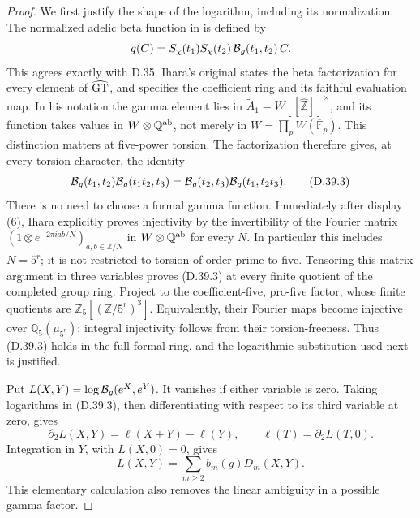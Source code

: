 \begin{proof}
We first justify the shape of the logarithm, including its
normalization. The normalized adelic beta function in
\cite[\S2.3, p.~101]{PBC_Furusho2003} is defined by
\[
 g(C)=S_\chi(t_1)S_\chi(t_2)\,{\cal B}_g(t_1,t_2)\,C.
\]
This agrees exactly with D.35. Ihara's original
\cite[introduction, p.~1, and \S2, display (6), preprint p.~9]{DE_Ihara2000}
states the beta factorization for every element of
\(\widehat{\rm GT}\), and specifies the coefficient
ring and its faithful evaluation map. In his notation
the gamma element lies in
\(\widetilde A_1=W[[\widehat{\mathbb Z}]]^\times\), and
its function takes values in \(W\otimes\mathbb Q^{\rm ab}\),
not merely in \(W=\prod_pW(\overline{\mathbb F}_p)\).
This distinction matters at five-power torsion.
The factorization therefore gives, at every torsion
character, the identity
\[
 {\cal B}_g(t_1,t_2){\cal B}_g(t_1t_2,t_3)
 ={\cal B}_g(t_2,t_3){\cal B}_g(t_1,t_2t_3).               \tag{D.39.3}
\]
There is no need to choose a formal gamma function.
Immediately after display (6), Ihara explicitly proves
injectivity by the invertibility of the Fourier matrix
\((1\otimes e^{-2\pi i ab/N})_{a,b\in\mathbb Z/N}\)
in \(W\otimes\mathbb Q^{\rm ab}\) for every \(N\).
In particular this includes \(N=5^r\); it is not
restricted to torsion of order prime to five.
Tensoring this matrix argument in three variables
proves (D.39.3) at every finite quotient of the
completed group ring. Project to the coefficient-five,
pro-five factor, whose finite quotients are
\(\mathbb Z_5[(\mathbb Z/5^r)^3]\). Equivalently,
their Fourier maps become injective over
\(\mathbb Q_5(\mu_{5^r})\); integral injectivity follows
from their torsion-freeness. Thus (D.39.3) holds in
the full formal ring, and the logarithmic substitution
used next is justified.

Put \(L(X,Y)=\log{\cal B}_g(e^X,e^Y)\). It vanishes if either
variable is zero. Taking logarithms in (D.39.3), then
differentiating with respect to its third variable at zero,
gives
\[
 \partial_2L(X,Y)=\ell(X+Y)-\ell(Y),
 \qquad \ell(T)=\partial_2L(T,0).
\]
Integration in \(Y\), with \(L(X,0)=0\), gives
\[
               L(X,Y)=\sum_{m\ge2}b_m(g)D_m(X,Y).         \tag{D.39.4}
\]
This elementary calculation also removes the linear
ambiguity in a possible gamma factor.


\end{proof}
